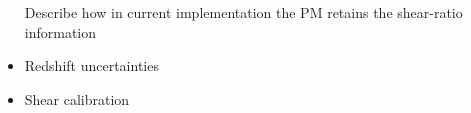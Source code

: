 \documentclass[fleqn,usenatbib]{mnras}
\begin{document}
\begin{itemize}
   Describe how in current implementation the PM retains the shear-ratio information
    
    \item Redshift uncertainties
    
    \item Shear calibration
    
    
    
\end{itemize}    


    
    
        
    
    
\end{document}
